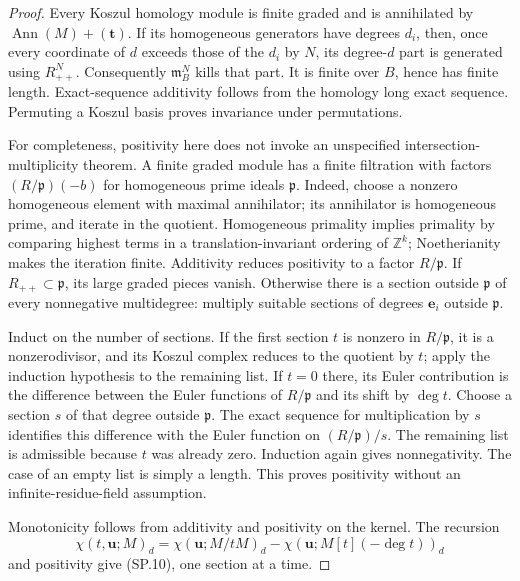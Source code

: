 \begin{proof}
Every Koszul homology module is finite graded and is annihilated by
$\operatorname{Ann}(M)+(\mathbf t)$.  If its homogeneous generators
have degrees $d_i$, then, once every coordinate of $d$ exceeds those
of the $d_i$ by $N$, its degree-$d$ part is generated using
$R_{++}^N$.  Consequently $\mathfrak m_B^N$ kills that part.  It is
finite over $B$, hence has finite length.  Exact-sequence additivity
follows from the homology long exact sequence.  Permuting a Koszul
basis proves invariance under permutations.

For completeness, positivity here does not invoke an unspecified
intersection-multiplicity theorem.  A finite graded module has a
finite filtration with factors $(R/\mathfrak p)(-b)$ for homogeneous
prime ideals $\mathfrak p$.  Indeed, choose a nonzero homogeneous
element with maximal annihilator; its annihilator is homogeneous
prime, and iterate in the quotient.  Homogeneous primality implies
primality by comparing highest terms in a translation-invariant
ordering of $\mathbb Z^k$; Noetherianity makes the iteration finite.
Additivity reduces positivity to a factor $R/\mathfrak p$.
If $R_{++}\subset\mathfrak p$, its large graded pieces vanish.
Otherwise there is a section outside $\mathfrak p$ of every
nonnegative multidegree: multiply suitable sections of degrees
$\mathbf e_i$ outside $\mathfrak p$.

Induct on the number of sections.  If the first section $t$ is
nonzero in $R/\mathfrak p$, it is a nonzerodivisor, and its Koszul
complex reduces to the quotient by $t$; apply the induction
hypothesis to the remaining list.  If $t=0$ there, its Euler
contribution is the difference between the Euler functions of
$R/\mathfrak p$ and its shift by $\deg t$.  Choose a section $s$ of
that degree outside $\mathfrak p$.  The exact sequence for
multiplication by $s$ identifies this difference with the Euler
function on $(R/\mathfrak p)/s$.  The remaining list is admissible
because $t$ was already zero.  Induction again gives nonnegativity.
The case of an empty list is simply a length.  This proves
positivity without an infinite-residue-field assumption.

Monotonicity follows from additivity and positivity on the kernel.
The recursion
\[
 \chi(t,\mathbf u;M)_d=
 \chi(\mathbf u;M/tM)_d-
 \chi(\mathbf u;M[t](-\deg t))_d
 \tag{SP.12}
\]
and positivity give (SP.10), one section at a time.


\end{proof}
